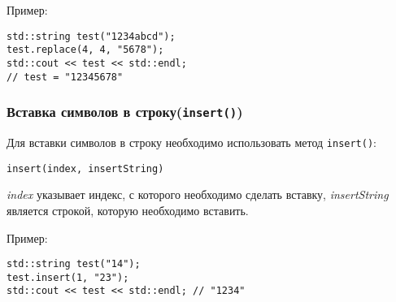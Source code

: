 Пример:
\begin{lstlisting}
std::string test("1234abcd");
test.replace(4, 4, "5678");
std::cout << test << std::endl; 
// test = "12345678"
\end{lstlisting}

\subsubsection{Вставка символов в строку(\texttt{insert()})}
Для вставки символов в строку необходимо использовать метод \lstinline|insert()|:

\lstinline|insert(index, insertString)|

\textit{index} указывает индекс, с которого необходимо сделать вставку, \textit{insertString} является строкой, которую необходимо вставить.

Пример:
\begin{lstlisting}
std::string test("14");
test.insert(1, "23");
std::cout << test << std::endl; // "1234"
\end{lstlisting}